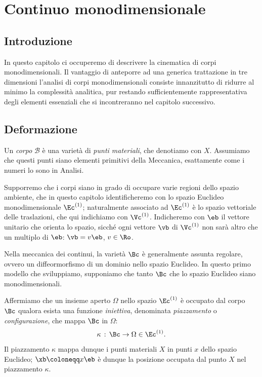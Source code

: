 \chapter{Continuo  monodimensionale}

\section{Introduzione}


In questo capitolo ci occuperemo di descrivere la cinematica di corpi monodimensionali. Il vantaggio di anteporre ad una generica trattazione in tre dimensioni l'analisi di corpi monodimensionali consiste innanzitutto di ridurre al minimo la complessità analitica, pur restando sufficientemente rappresentativa degli elementi essenziali che si incontreranno nel capitolo successivo.





\section{Deformazione}

Un \textit{corpo}  $\mathcal{B}$ è una varietà di \textit{punti materiali}, che denotiamo con $X$. Assumiamo che questi punti siano elementi primitivi della Meccanica, esattamente come i numeri lo sono in Analisi.


Supporremo che i corpi siano in grado di occupare varie  regioni dello spazio ambiente, che in questo capitolo identificheremo con lo spazio Euclideo monodimensionale $\Ec^{(1)}$; naturalmente associato ad $\Ec^{(1)}$ è lo spazio vettoriale delle traslazioni, che qui indichiamo con $\Vc^{(1)}$. Indicheremo con $\eb$ il vettore unitario che orienta lo spazio, sicché ogni vettore $\vb$ di $\Vc^{(1)}$ non sarà altro che un multiplo di $\eb$: $\vb =v\eb$, $v\in \Ro$.

Nella meccanica dei continui, la varietà $\Bc$ è generalmente assunta regolare, ovvero un diffeormorfismo di un dominio nello spazio Euclideo. In questo primo modello che sviluppiamo, supponiamo che tanto $\Bc$ che lo spazio Euclideo siano monodimensionali.

Affermiamo che un insieme aperto $\Omega$ nello spazio $\Ec^{(1)}$ è occupato dal corpo $\Bc$ qualora esista una funzione \textit{iniettiva}, denominata \textit{piazzamento} o \textit{configurazione}, che mappa $\Bc$ in $\Omega$:
\begin{equation}
\kappa\,:\,\Bc\to \Omega\in \Ec^{(1)}.
\end{equation}
Il piazzamento $\kappa$ mappa dunque i punti materiali $X$ in punti $x$ dello spazio Euclideo; $\xb \coloneqq x\eb$ è dunque la posizione occupata dal punto $X$ nel piazzamento $\kappa$. 


